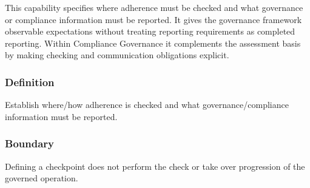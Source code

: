 This capability specifies where adherence must be checked and what governance or compliance information must be reported. It gives the governance framework observable expectations without treating reporting requirements as completed reporting. Within Compliance Governance it complements the assessment basis by making checking and communication obligations explicit.

\subsubsection*{Definition}

Establish where/\allowbreak{}how adherence is checked and what governance/\allowbreak{}compliance information must be reported.

\subsubsection*{Boundary}

Defining a checkpoint does not perform the check or take over progression of the governed operation.

